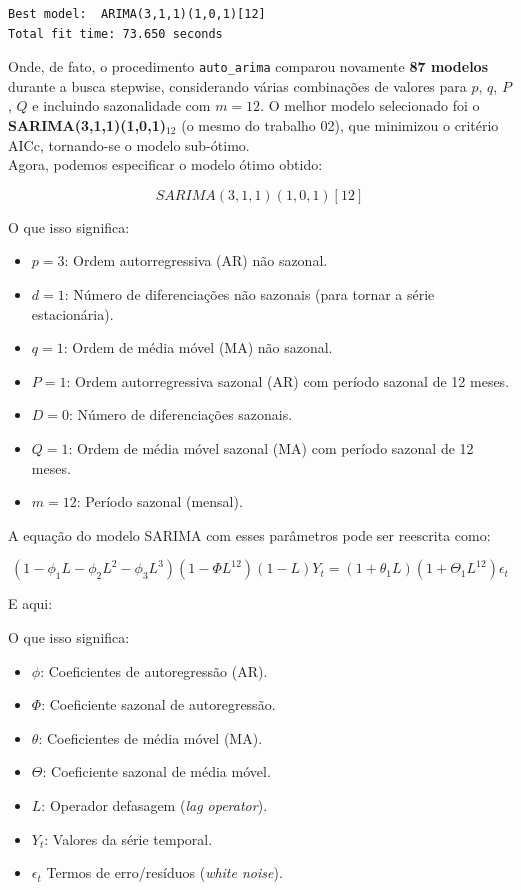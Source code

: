 \documentclass[a4paper, 12pt]{article}
\begin{document}
\begin{verbatim}
Best model:  ARIMA(3,1,1)(1,0,1)[12]          
Total fit time: 73.650 seconds
\end{verbatim}

Onde, de fato, o procedimento \texttt{auto\_arima} comparou novamente \textbf{87 modelos} durante a busca stepwise, considerando várias combinações de valores para \(p\), \(q\), \(P\), \(Q\) e incluindo sazonalidade com \(m=12\). O melhor modelo selecionado foi o \textbf{SARIMA(3,1,1)(1,0,1)$_{12}$} (o mesmo do trabalho 02), que minimizou o critério AICc, tornando-se o modelo sub-ótimo.\\

Agora, podemos especificar o modelo ótimo obtido:

\[
SARIMA(3,1,1)(1,0,1)[12]
\]
 
O que isso significa:

\begin{itemize}
    \item $p=3$: Ordem autorregressiva (AR) não sazonal.
    \item $d=1$: Número de diferenciações não sazonais (para tornar a série estacionária).
    \item $q=1$: Ordem de média móvel (MA) não sazonal.
    \item $P=1$: Ordem autorregressiva sazonal (AR) com período sazonal de 12 meses.
    \item $D=0$: Número de diferenciações sazonais.
    \item $Q=1$: Ordem de média móvel sazonal (MA) com período sazonal de 12 meses.
    \item $m=12$: Período sazonal (mensal).
\end{itemize}

A equação do modelo SARIMA com esses parâmetros pode ser reescrita como:

\begin{equation*}
    (1-\phi_1L - \phi_2L^2-\phi_3L^3)(1-\Phi L^{12})(1-L)Y_t = (1+\theta_1L)(1+\Theta_1L^{12})\epsilon_t
\end{equation*}

E aqui:

O que isso significa:

\begin{itemize}
    \item $\phi$: Coeficientes de autoregressão (AR).
    \item $\Phi$: Coeficiente sazonal de autoregressão.
    \item $\theta$: Coeficientes de média móvel (MA).
    \item $\Theta$: Coeficiente sazonal de média móvel.
    \item $L$: Operador defasagem (\textit{lag operator}).
    \item $Y_t$: Valores da série temporal.
    \item $\epsilon_t$ Termos de erro/resíduos (\textit{white noise}).
\end{itemize}
\end{document}
